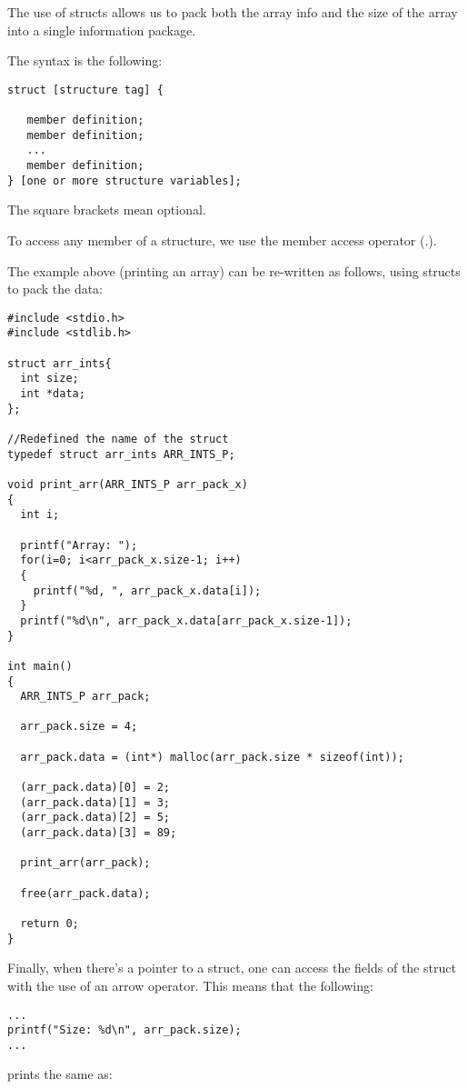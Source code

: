 \documentclass[11pt]{article}
\begin{document}
The use of structs allows us to pack both the array info and the size of the array into a single information package.

The syntax is the following:

\begin{lstlisting}[numbers=none]
struct [structure tag] {

   member definition;
   member definition;
   ...
   member definition;
} [one or more structure variables];
\end{lstlisting}


The square brackets mean optional.

To access any member of a structure, we use the member access operator (.).

The example above (printing an array) can be re-written as follows, using structs to pack the data:


\begin{lstlisting}
#include <stdio.h>
#include <stdlib.h>

struct arr_ints{
  int size;
  int *data;
};

//Redefined the name of the struct
typedef struct arr_ints ARR_INTS_P;

void print_arr(ARR_INTS_P arr_pack_x)
{
  int i;

  printf("Array: ");
  for(i=0; i<arr_pack_x.size-1; i++)
  {
    printf("%d, ", arr_pack_x.data[i]);
  }
  printf("%d\n", arr_pack_x.data[arr_pack_x.size-1]);
}

int main()
{
  ARR_INTS_P arr_pack;

  arr_pack.size = 4;

  arr_pack.data = (int*) malloc(arr_pack.size * sizeof(int));

  (arr_pack.data)[0] = 2;
  (arr_pack.data)[1] = 3;
  (arr_pack.data)[2] = 5;
  (arr_pack.data)[3] = 89;

  print_arr(arr_pack);

  free(arr_pack.data);

  return 0;
}
\end{lstlisting}


Finally, when there's a pointer to a struct, one can access the fields of the struct with the use of an arrow operator. This means that the following:

\begin{lstlisting}[numbers=none]
...
printf("Size: %d\n", arr_pack.size);
...
\end{lstlisting}

prints the same as:
\end{document}
